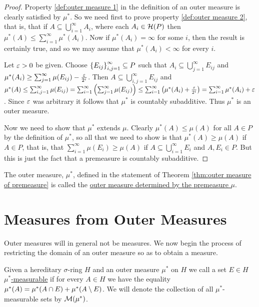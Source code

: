 \begin{proof}
Property \ref{def:outer measure 1} in the definition of an outer measure is clearly satisfied by $\mu^*$. So we need first to prove property \ref{def:outer measure 2}, that is, that if $A\subseteq\bigcup_{i=1}^\infty A_i$, where each $A_i\in{\cal H}(P)$ then $\mu^*(A)\leq\sum_{i=1}^\infty \mu^*(A_i)$. Now if $\mu^*(A_i)=\infty$ for some $i$, then the result is certainly true, and so we may assume that $\mu^*(A_i)<\infty$ for every $i$.

Let $\varepsilon>0$ be given. Choose $\left\{E_{ij}\right\}_{i, j=1}^\infty\subseteq P$ such that $A_i\subseteq\bigcup_{j=1}^\infty E_{ij}$ and $\mu^*(A_i)\geq\sum_{j=1}^\infty\mu(E_{ij})-\frac{\varepsilon}{2^i}$. Then $A\subseteq\bigcup_{i,j=1}^\infty E_{i j}$ and $\mu^*(A)\leq\sum_{i,j=1}^\infty\mu(E_{ij})=\sum_{i=1}^\infty\left(\sum_{j=1}^\infty\mu(E_{i j})\right)\leq \sum_{i=1}^\infty\left(\mu^*(A_i)+\frac{\varepsilon}{2^i}\right)\allowbreak=\sum_{i=1}^\infty\mu^*(A_i)+\varepsilon$. Since $\varepsilon$ was arbitrary it follows that $\mu^*$ is countably subadditive. Thus $\mu^*$ is an outer measure.

Now we need to show that $\mu^*$ extends $\mu$. Clearly $\mu^*(A)\leq\mu(A)$ for all $A\in P$ by the definition of $\mu^*$, so all that we need to show is that $\mu^*(A)\geq\mu(A)$ if $A\in P$, that is, that $\sum_{i=1}^\infty\mu(E_i)\geq\mu(A)$ if $A\subseteq \bigcup_{i=1}^\infty E_i$ and $A, E_i \in P$. But this is just the fact that a premeasure is countably subadditive.
\end{proof}

\begin{definition}
The outer measure, $\mu^*$, defined in the statement of Theorem \ref{thm:outer measure of premeasure} is called the \underline{outer measure determined by the premeasure $\mu$}.
\end{definition}

\section{Measures from Outer Measures}

Outer measures will in general not be measures. We now begin the process of restricting the domain of an outer measure so as to obtain a measure.

\begin{definition}
Given a hereditary $\sigma$-ring $H$ and an outer measure $\mu^*$ on $H$ we call a set $E\in H$ \underline{$\mu^*$-measurable} if for every $A\in H$ we have the equality $\mu^*(A)=\mu^*(A\cap E)+\mu^*(A\setminus E)$. We will denote the collection of all $\mu^*$-measurable sets by ${\cal M}(\mu^*)$.
\end{definition}

